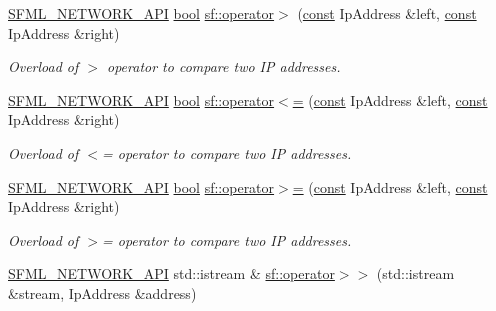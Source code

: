 \begin{DoxyCompactItemize}
\hyperlink{sfml_2dep_2_s_f_m_l-2_84_82_2include_2_s_f_m_l_2_network_2_export_8hpp_ac5d46d4ffd98e947e28c54d051b338e7}{S\-F\-M\-L\-\_\-\-N\-E\-T\-W\-O\-R\-K\-\_\-\-A\-P\-I} \hyperlink{term__entry_8h_a002004ba5d663f149f6c38064926abac}{bool} \hyperlink{namespacesf_a7344fe65b9ee438bab496c9889a34202}{sf\-::operator$>$} (\hyperlink{term__entry_8h_a57bd63ce7f9a353488880e3de6692d5a}{const} Ip\-Address \&left, \hyperlink{term__entry_8h_a57bd63ce7f9a353488880e3de6692d5a}{const} Ip\-Address \&right)
\begin{DoxyCompactList}\small\item\em Overload of $>$ operator to compare two I\-P addresses. \end{DoxyCompactList}\item 
\hyperlink{sfml_2dep_2_s_f_m_l-2_84_82_2include_2_s_f_m_l_2_network_2_export_8hpp_ac5d46d4ffd98e947e28c54d051b338e7}{S\-F\-M\-L\-\_\-\-N\-E\-T\-W\-O\-R\-K\-\_\-\-A\-P\-I} \hyperlink{term__entry_8h_a002004ba5d663f149f6c38064926abac}{bool} \hyperlink{namespacesf_aeb411e03dd15af718fe95ed4626190ad}{sf\-::operator$<$=} (\hyperlink{term__entry_8h_a57bd63ce7f9a353488880e3de6692d5a}{const} Ip\-Address \&left, \hyperlink{term__entry_8h_a57bd63ce7f9a353488880e3de6692d5a}{const} Ip\-Address \&right)
\begin{DoxyCompactList}\small\item\em Overload of $<$= operator to compare two I\-P addresses. \end{DoxyCompactList}\item 
\hyperlink{sfml_2dep_2_s_f_m_l-2_84_82_2include_2_s_f_m_l_2_network_2_export_8hpp_ac5d46d4ffd98e947e28c54d051b338e7}{S\-F\-M\-L\-\_\-\-N\-E\-T\-W\-O\-R\-K\-\_\-\-A\-P\-I} \hyperlink{term__entry_8h_a002004ba5d663f149f6c38064926abac}{bool} \hyperlink{namespacesf_a457fb40b390861abae4234f6059d1c48}{sf\-::operator$>$=} (\hyperlink{term__entry_8h_a57bd63ce7f9a353488880e3de6692d5a}{const} Ip\-Address \&left, \hyperlink{term__entry_8h_a57bd63ce7f9a353488880e3de6692d5a}{const} Ip\-Address \&right)
\begin{DoxyCompactList}\small\item\em Overload of $>$= operator to compare two I\-P addresses. \end{DoxyCompactList}\item 
\hyperlink{sfml_2dep_2_s_f_m_l-2_84_82_2include_2_s_f_m_l_2_network_2_export_8hpp_ac5d46d4ffd98e947e28c54d051b338e7}{S\-F\-M\-L\-\_\-\-N\-E\-T\-W\-O\-R\-K\-\_\-\-A\-P\-I} std\-::istream \& \hyperlink{namespacesf_a9200951bb2c741b0ae01d1d1831d92ff}{sf\-::operator$>$$>$} (std\-::istream \&stream, Ip\-Address \&address)

\end{DoxyCompactItemize}
